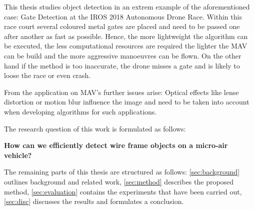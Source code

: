 This thesis studies object detection in an extrem example of the aforementioned case: Gate Detection at the IROS 2018 Autonomous Drone Race. Within this race court several coloured metal gates are placed and need to be passed one after another as fast as possible. Hence, the more lightweight the algorithm can be executed, the less computational resources are required the lighter the \ac{MAV} can be build and the more aggressive manoeuvres can be flown. On the other hand if the method is too inaccurate, the drone misses a gate and is likely to loose the race or even crash.

From the application on MAV's further issues arise: Optical effects like lense distortion or motion blur influence the image and need to be taken into account when developing algorithms for such applications.

The research question of this work is formulated as follows:

\textbf{How can we efficiently detect wire frame objects on a micro-air vehicle?}


The remaining parts of this thesis are structured as follows: \autoref{sec:background} outlines background and related work, \autoref{sec:method} describes the proposed method, \autoref{sec:evaluation} contains the  experiments that have been carried out, \autoref{sec:disc} discusses the results and formulates a conclusion.
